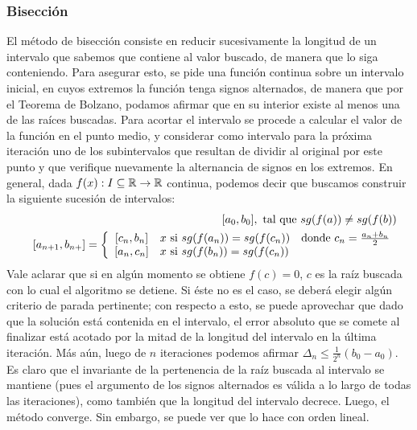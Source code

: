 \subsubsection{Bisección}
El método de bisección consiste en reducir sucesivamente la longitud de un intervalo que sabemos que contiene al valor buscado, de manera que lo siga conteniendo. Para asegurar esto, se pide una función continua sobre un intervalo inicial, en cuyos extremos la función tenga signos alternados, de manera que por el Teorema de Bolzano, podamos afirmar que en su interior existe al menos una de las raíces buscadas. Para acortar el intervalo se procede a calcular el valor de la función en el punto medio, y considerar como intervalo para la próxima iteración uno de los subintervalos que resultan de dividir al original por este punto y que verifique nuevamente la alternancia de signos en los extremos. En general, dada $f(x): I\subseteq \mathbb{R} \rightarrow \mathbb{R} $ continua, podemos decir que buscamos construir la siguiente sucesión de intervalos:
	\begin{eqnarray}
		&& [a_0, b_0], \text{ tal que } sg(f(a)) \neq sg(f(b)) \nonumber \\
		&& [a_{n+1}, b_{n+}] = \left\{
			\begin{array}{c l l }
  				[c_n, b_n] & x\mbox{ si } sg(f(a_n)) = sg(f(c_n)) & \mbox{donde } c_n = \frac{a_n+b_n}{2} \nonumber \\
  				 \left[a_{n}, c_{n}\right] & x\mbox{ si } sg(f(b_n)) = sg(f(c_n)) &  \nonumber \\ %
			\end{array} \nonumber
		\right.		\nonumber \\
	\end{eqnarray}
Vale aclarar que si en algún momento se obtiene $f(c) = 0$, $c$ es la raíz buscada con lo cual el algoritmo se detiene. Si éste no es el caso, se deberá elegir algún criterio de parada pertinente; con respecto a esto, se puede aprovechar que dado que la solución está contenida en el intervalo, el error absoluto que se comete al finalizar está acotado por la mitad de la longitud del intervalo en la última iteración. Más aún, luego de $n$ iteraciones podemos afirmar $\Delta_n \leq \frac{1}{2^n} (b_0-a_0)$. Es claro que el invariante de la pertenencia de la raíz buscada al intervalo se mantiene (pues el argumento de los signos alternados es válida a lo largo de todas las iteraciones), como también que la longitud del intervalo decrece. Luego, el método converge. Sin embargo, se puede ver que lo hace con orden lineal.


